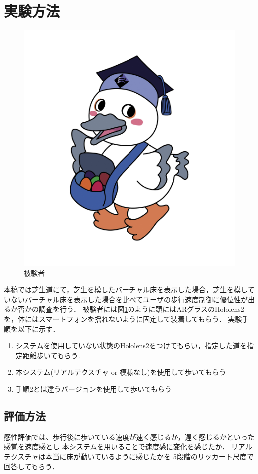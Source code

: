 \documentclass[dvipdfmx]{jsarticle}
\begin{document}
\section{実験方法}
\begin{figure}[htbp]
    \centering
    \includegraphics[width=0.8\linewidth]{fig/koukaton.jpg}
    \caption{被験者}
    \label{fig:kokaton}
\end{figure}

本稿では芝生道にて，芝生を模したバーチャル床を表示した場合，芝生を模していないバーチャル床を表示した場合を比べてユーザの歩行速度制御に優位性が出るか否かの調査を行う．
被験者には図\ref{fig:kokaton}のように頭にはARグラスのHololens2を，体にはスマートフォンを揺れないように固定して装着してもらう．
実験手順を以下に示す．
\begin{enumerate}
    \item システムを使用していない状態のHololens2をつけてもらい，指定した道を指定距離歩いてもらう.
    \item 本システム(リアルテクスチャ or 模様なし)を使用して歩いてもらう
    \item 手順2とは違うバージョンを使用して歩いてもらう
\end{enumerate}

 \subsection{評価方法}
 感性評価では、歩行後に歩いている速度が速く感じるか，遅く感じるかといった感覚を速度感とし
 本システムを用いることで速度感に変化を感じたか．
 リアルテクスチャは本当に床が動いているように感じたかを
 5段階のリッカート尺度で回答してもらう．
\end{document}
